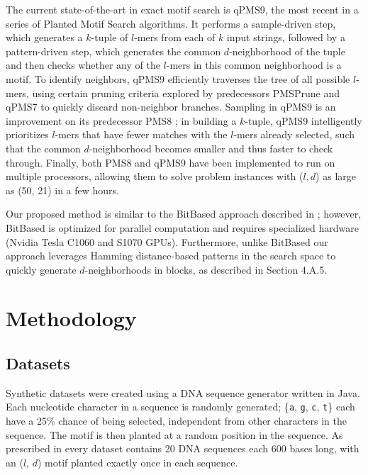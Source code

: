 \documentclass[conference]{IEEEtran}
\begin{document}
	The current state-of-the-art in exact motif search is qPMS9, the most recent in a series \cite{pms2007,pms2014,pms2015} of Planted Motif Search algorithms. It performs a sample-driven step, which generates a $k$-tuple of $l$-mers from each of $k$ input strings, followed by a pattern-driven step, which generates the common $d$-neighborhood of the tuple and then checks whether any of the $l$-mers in this common neighborhood is a motif. To identify neighbors, qPMS9 efficiently traverses the tree of all possible $l$-mers, using certain pruning criteria explored by predecessors PMSPrune and qPMS7 \cite{pms2007} to quickly discard non-neighbor branches. Sampling in qPMS9 is an improvement on its predecessor PMS8 \cite{pms2014}; in building a $k$-tuple, qPMS9 intelligently prioritizes $l$-mers that have fewer matches with the $l$-mers already selected, such that the common $d$-neighborhood becomes smaller and thus faster to check through.  Finally, both PMS8 and qPMS9 have been implemented to run on multiple processors, allowing them to solve problem instances with ($l, d$) as large as (50, 21) in a few hours.

	Our proposed method %
	is similar to the BitBased approach described in \cite{dasari2010efficient}; however, BitBased is optimized for parallel computation and requires specialized hardware (Nvidia Tesla C1060 and S1070 GPUs). Furthermore, unlike BitBased our approach leverages Hamming distance-based patterns in the search space to quickly generate $d$-neighborhoods in blocks, as described in Section 4.A.5.
	
\section{Methodology}

	\subsection{Datasets}
		Synthetic datasets were created using a DNA sequence generator written in Java. Each nucleotide character in a sequence is randomly generated; \{\texttt{a}, \texttt{g}, \texttt{c}, \texttt{t}\} each have a 25\% chance of being selected, independent from other characters in the sequence. The motif is then planted at a random position in the sequence. As prescribed in \cite{pevzner2000combinatorial} every dataset contains 20 DNA sequences each 600 bases long, with an ($l$, $d$) motif planted exactly once in each sequence.
\end{document}
